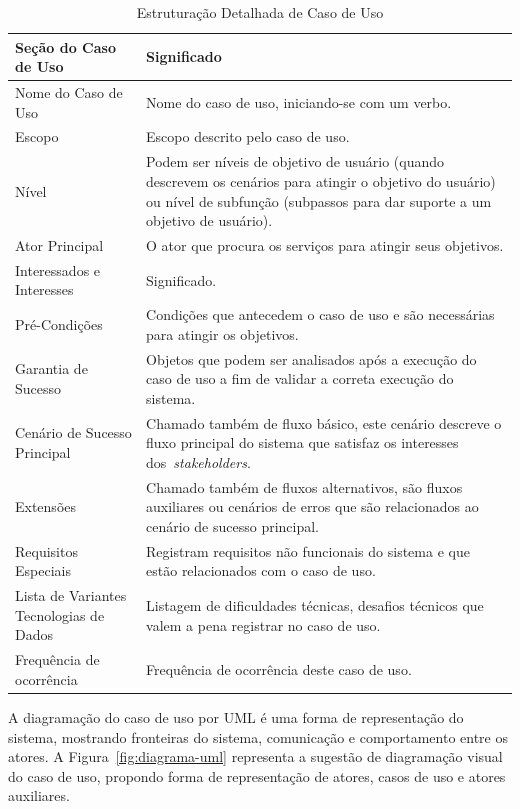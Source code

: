 \begin{table}
	\caption{Estruturação Detalhada de Caso de Uso}
	\begin{tabular}{|p{5cm} | p{9cm}|}
		\hline
		\textbf{Seção do Caso de Uso}	& \textbf{Significado} \\
		\hline
		Nome do Caso de Uso 	& Nome do caso de uso, iniciando-se com um verbo.  \\
		\hline
		Escopo	& Escopo descrito pelo caso de uso. \\
		\hline
		Nível	& Podem ser níveis de objetivo de usuário (quando descrevem os cenários para atingir o objetivo do usuário) ou nível de subfunção (subpassos para dar suporte a um objetivo de usuário). \\
		\hline
		Ator Principal	& O ator que procura os serviços para atingir seus objetivos.  \\
		\hline
		Interessados e Interesses	& Significado.  \\
		\hline
		Pré-Condições	& Condições que antecedem o caso de uso e são necessárias para atingir os objetivos. \\
		\hline
		Garantia de Sucesso	& Objetos que podem ser analisados após a execução do caso de uso a fim de validar a correta execução do sistema.  \\
		\hline
		Cenário de Sucesso Principal	& Chamado também de fluxo básico, este cenário descreve o fluxo principal do sistema que satisfaz os interesses dos~\emph{stakeholders}.  \\
		\hline
		Extensões	& Chamado também de fluxos alternativos, são fluxos auxiliares ou cenários de erros que são relacionados ao cenário de sucesso principal. \\
		\hline
		Requisitos Especiais	& Registram requisitos não funcionais do sistema e que estão relacionados com o caso de uso. \\
		\hline
		Lista de Variantes Tecnologias de Dados	& Listagem de dificuldades técnicas, desafios técnicos que valem a pena registrar no caso de uso. \\
		\hline
		Frequência de ocorrência	& Frequência de ocorrência deste caso de uso. \\
		\hline
	\end{tabular}
	\label{tabela:topicos_uc}
\end{table}

A diagramação do caso de uso por UML é uma forma de representação do sistema, mostrando fronteiras do sistema, comunicação e comportamento entre os atores. A Figura~\ref{fig:diagrama-uml} representa a sugestão de diagramação visual do caso de uso, propondo forma de representação de atores, casos de uso e atores auxiliares.

